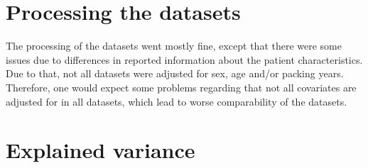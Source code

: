 \begin{table}
    \caption{Characteristics of the studies in this project. EV=Explained Variance. Explained variance is the proportion of variance that is due to case-control characteristics (see \autoref{subsec:explained_variance}).}
    \label{tab:studies}
\end{table}


\section{Processing the datasets}

The processing of the datasets went mostly fine, except that there were some issues due to differences in reported information about the patient characteristics. Due to that, not all datasets were adjusted for sex, age and/or packing years. Therefore, one would expect some problems regarding that not all covariates are adjusted for in all datasets, which lead to worse comparability of the datasets.


\section{Explained variance}
\label{sec:explained_variance_res}

